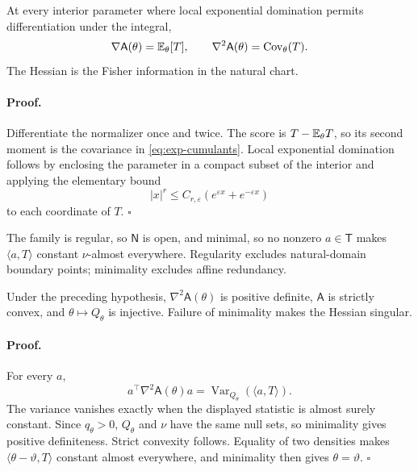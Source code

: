 At every interior parameter where local exponential domination permits
differentiation under the integral,
\begin{equation}
\nabla\mathsf A(\theta)=\mathbb E_\theta[T],
\qquad
\nabla^2\mathsf A(\theta)=\operatorname{Cov}_\theta(T).
\label{eq:exp-cumulants}
\end{equation}
The Hessian is the Fisher information in the natural chart.

\paragraph{Proof.}
Differentiate the normalizer once and twice. The score is
\(T-\mathbb E_\theta T\), so its second moment is the covariance in
\eqref{eq:exp-cumulants}. Local exponential domination follows by enclosing
the parameter in a compact subset of the interior and applying the elementary
bound
\begin{equation}
|x|^r\leq C_{r,\varepsilon}
\left(e^{\varepsilon x}+e^{-\varepsilon x}\right)
\label{eq:exp-domination}
\end{equation}
to each coordinate of \(T\). \(\square\)

The family is regular, so \(\mathsf N\) is open, and minimal, so no nonzero
\(a\in\mathsf T\) makes \(\langle a,T\rangle\) constant
\(\nu\)-almost everywhere. Regularity excludes natural-domain boundary
points; minimality excludes affine redundancy. 

Under the preceding hypothesis, \(\nabla^2\mathsf A(\theta)\) is positive
definite, \(\mathsf A\) is strictly convex, and
\(\theta\mapsto Q_\theta\) is injective. Failure of minimality makes the
Hessian singular. 

\paragraph{Proof.}
For every \(a\),
\[
a^\top\nabla^2\mathsf A(\theta)a
=\operatorname{Var}_{Q_\theta}(\langle a,T\rangle).
\]
The variance vanishes exactly when the displayed statistic is almost surely
constant. Since \(q_\theta>0\), \(Q_\theta\) and \(\nu\) have the same null
sets, so minimality gives positive definiteness. Strict convexity follows.
Equality of two densities makes
\(\langle\theta-\vartheta,T\rangle\) constant almost everywhere, and
minimality then gives \(\theta=\vartheta\). \(\square\)

